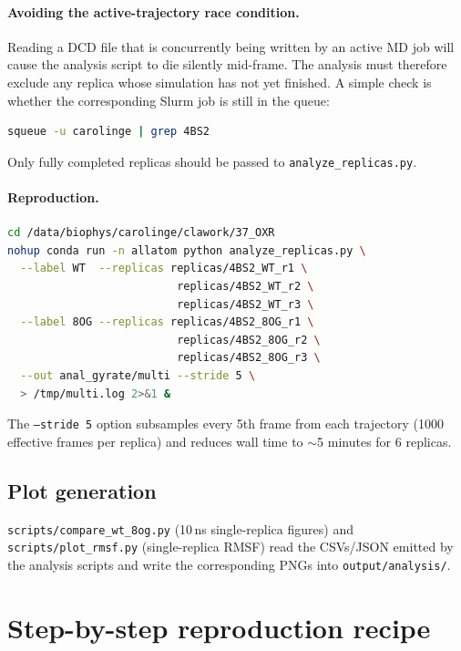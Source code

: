 \documentclass[11pt,a4paper]{article}
\begin{document}
\paragraph{Avoiding the active-trajectory race condition.}
Reading a DCD file that is concurrently being written by an active MD
job will cause the analysis script to die silently mid-frame. The
analysis must therefore exclude any replica whose simulation has not
yet finished. A simple check is whether the corresponding Slurm job is
still in the queue:
\begin{lstlisting}[language=bash]
squeue -u carolinge | grep 4BS2
\end{lstlisting}
Only fully completed replicas should be passed to
\texttt{analyze\_replicas.py}.

\paragraph{Reproduction.}
\begin{lstlisting}[language=bash]
cd /data/biophys/carolinge/clawork/37_OXR
nohup conda run -n allatom python analyze_replicas.py \
  --label WT  --replicas replicas/4BS2_WT_r1 \
                          replicas/4BS2_WT_r2 \
                          replicas/4BS2_WT_r3 \
  --label 8OG --replicas replicas/4BS2_8OG_r1 \
                          replicas/4BS2_8OG_r2 \
                          replicas/4BS2_8OG_r3 \
  --out anal_gyrate/multi --stride 5 \
  > /tmp/multi.log 2>&1 &
\end{lstlisting}

The \texttt{--stride 5} option subsamples every 5th frame from each
trajectory (1000 effective frames per replica) and reduces wall time
to $\sim$5 minutes for 6 replicas.

\subsection{Plot generation}
\texttt{scripts/compare\_wt\_8og.py} (10\,ns single-replica figures) and
\texttt{scripts/plot\_rmsf.py} (single-replica RMSF) read the CSVs/JSON
emitted by the analysis scripts and write the corresponding PNGs into
\texttt{output/analysis/}.

\section{Step-by-step reproduction recipe}
\label{sec:repro}
\end{document}
